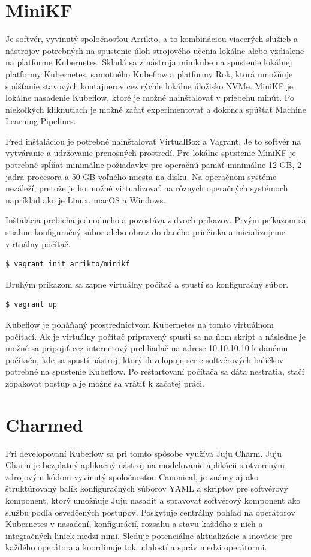 \section{MiniKF}

Je softvér, vyvinutý spoločnosťou Arrikto, a to kombináciou viacerých služieb a nástrojov potrebných na spustenie úloh strojového učenia lokálne alebo vzdialene na platforme Kubernetes. Skladá sa z nástroja minikube na spustenie lokálnej platformy Kubernetes, samotného Kubeflow a platformy Rok, ktorá umožňuje spúšťanie stavových kontajnerov cez rýchle lokálne úložisko NVMe. MiniKF je lokálne nasadenie Kubeflow, ktoré je možné nainštalovať v priebehu minút. Po niekoľkých kliknutiach je možné začať experimentovať a dokonca spúšťať Machine Learning Pipelines.

Pred inštaláciou je potrebné nainštalovať VirtualBox a Vagrant. Je to softvér na vytváranie a udržovanie prenosných prostredí. Pre lokálne spustenie MiniKF je potrebné spĺňať minimálne požiadavky pre operačnú pamäť minimálne 12 GB, 2 jadra procesora a 50 GB voľného miesta na disku. Na operačnom systéme nezáleží, pretože je ho možné virtualizovať na rôznych operačných systémoch napríklad ako je Linux, macOS a Windows.

Inštalácia prebieha jednoducho a pozostáva z dvoch príkazov. Prvým príkazom sa stiahne konfiguračný súbor alebo obraz do daného priečinka a inicializujeme virtuálny počítač.
\begin{lstlisting}[language=Bash]
    $ vagrant init arrikto/minikf
    \end{lstlisting}
Druhým príkazom sa zapne virtuálny počítač a spustí sa konfiguračný súbor.
\begin{lstlisting}[language=Bash]
    $ vagrant up
    \end{lstlisting}
Kubeflow je poháňaný prostredníctvom Kubernetes na tomto virtuálnom počítací. Ak je virtuálny počítač pripravený spusti sa na ňom skript a následne je možné sa pripojiť cez internetový prehliadač na adrese 10.10.10.10 k danému počítaču, kde sa spustí nástroj, ktorý developuje serie softvérových balíčkov potrebné na spustenie Kubeflow. Po reštartovaní počítača sa dáta nestratia, stačí zopakovať postup a je možné sa vrátiť k začatej práci.

\section{Charmed}

Pri developovaní Kubeflow sa pri tomto spôsobe využíva Juju Charm. Juju Charm je bezplatný aplikačný nástroj na modelovanie aplikácii s otvoreným zdrojovým kódom vyvinutý spoločnosťou Canonical, je známy aj ako štruktúrovaný balík konfiguračných súborov YAML a skriptov pre softvérový komponent, ktorý umožňuje Juju nasadiť a spravovať softvérový komponent ako službu podľa osvedčených postupov. Poskytuje centrálny pohľad na operátorov Kubernetes v nasadení, konfigurácií, rozsahu a stavu každého z nich a integračných liniek medzi nimi. Sleduje potenciálne aktualizácie a inovácie pre každého operátora a koordinuje tok udalostí a správ medzi operátormi.

